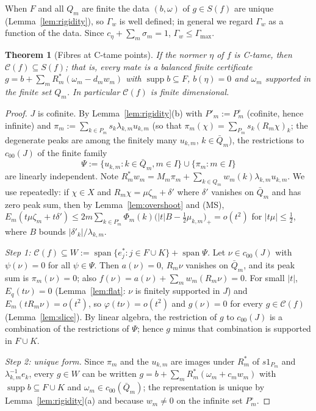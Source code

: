 \documentclass[10pt]{amsart}
\newtheorem{theorem}{Theorem}[section]
\theoremstyle{definition}
\theoremstyle{remark}
\newcommand{\supp}{\operatorname{supp}}
\newcommand{\spn}{\operatorname{span}}
\newcommand{\Cset}{\mathcal C}
\begin{document}
When $F$ and all $Q_m$ are finite the data $(b,\omega)$ of $g\in S(f)$ are
unique (Lemma~\ref{lem:rigidity}), so $\Gamma_w$ is well defined; in general
we regard $\Gamma_w$ as a function of the data.  Since $c_\eta+\sum_m
\sigma_m=1$, $\Gamma_w\le\Gamma_{\max}$.

\begin{theorem}[Fibres at C-tame points]\label{thm:tamefibre}
If the normer $\eta$ of $f$ is C-tame, then $\Cset(f)\subseteq S(f)$; that
is, every mate is a balanced finite certificate
$g=b+\sum_mR_m^*(\omega_m-d_mw_m)$ with $\supp b\subseteq F$, $b(\eta)=0$
and $\omega_m$ supported in the finite set $Q_m$.  In particular
$\Cset(f)$ is finite dimensional.
\end{theorem}

\begin{proof}
$J$ is cofinite.  By Lemma~\ref{lem:rigidity}(b) with $P'_m:=P^\circ_m$
(cofinite, hence infinite) and $\pi_m:=\sum_{k\in P_m}s_k\lambda_{k,m}
u_{k,m}$ (so that $\pi_m(\chi)=\sum_{P_m}s_k(R_m\chi)_k$; the degenerate
peaks are among the finitely many $u_{k,m}$, $k\in\bar Q_m$), the
restrictions to $c_{00}(J)$ of the finite family
\[
 \Psi:=\{u_{k,m}:k\in\bar Q_m,m\in I\}\cup\{\pi_m:m\in I\}
\]
are linearly independent.  Note $R_m^*w_m=M_m\pi_m+\sum_{k\in
Q_m}w_m(k)\lambda_{k,m}u_{k,m}$.  We use repeatedly: if $\chi\in X$ and
$R_m\chi=\mu\zeta_m+\delta'$ where $\delta'$ vanishes on $\bar Q_m$ and
has zero peak sum, then by Lemma~\ref{lem:overshoot} and \textup{(MS)},
$E_m(t\mu\zeta_m+t\delta')\le2m\sum_{k\in P^\circ_m}\Phi_m(k)\big(|t|B-
\tfrac12\mu_{k,m}\big)_+=o(t^2)$ for $|t\mu|\le\frac12$, where $B$ bounds
$|\delta'_k|/\lambda_{k,m}$.

\emph{Step 1: $\Cset(f)\subseteq W:=\spn\{e_j^*:j\in F\cup K\}+\spn\Psi$.}
Let $\nu\in c_{00}(J)$ with $\psi(\nu)=0$ for all $\psi\in\Psi$.  Then
$a(\nu)=0$, $R_m\nu$ vanishes on $\bar Q_m$, and its peak sum is
$\pi_m(\nu)=0$; also $f(\nu)=a(\nu)+\sum_mw_m(R_m\nu)=0$.  For small $|t|$,
$E_q(t\nu)=0$ (Lemma~\ref{lem:flat}: $\nu$ is finitely supported in $J$) and
$E_m(tR_m\nu)=o(t^2)$, so $\varphi(t\nu)=o(t^2)$ and $g(\nu)=0$ for every
$g\in\Cset(f)$ (Lemma~\ref{lem:slice}).  By linear algebra, the restriction
of $g$ to $c_{00}(J)$ is a combination of the restrictions of $\Psi$; hence
$g$ minus that combination is supported in $F\cup K$.

\emph{Step 2: unique form.}  Since $\pi_m$ and the $u_{k,m}$ are images
under $R_m^*$ of $s1_{P_m}$ and $\lambda_{k,m}^{-1}e_k$, every $g\in W$ can
be written $g=b+\sum_mR_m^*(\omega_m+c_mw_m)$ with $\supp b\subseteq F\cup
K$ and $\omega_m\in c_{00}(\bar Q_m)$; the representation is unique by
Lemma~\ref{lem:rigidity}(a) and because $w_m\ne0$ on the infinite set
$P_m^\circ$.


\end{proof}
\end{document}
